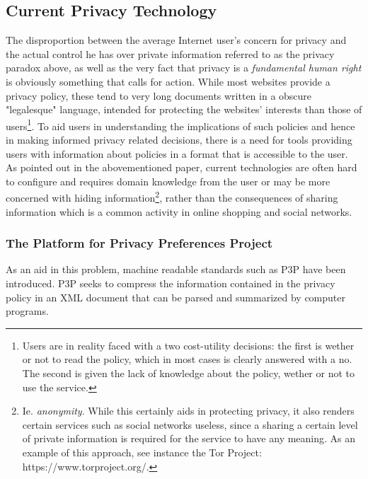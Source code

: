 \subsection{Current Privacy Technology}\label{privTech}
The disproportion between the average Internet user's concern for privacy and the actual control he has over private information referred to as the privacy paradox above, as well as the very fact that privacy is a \emph{fundamental human right} is obviously something that calls for action. While most websites provide a privacy policy, these tend to very long documents written in a obscure "legalesque" language, intended  for protecting the websites' interests than those of users\footnote{Users are in reality faced with a two cost-utility decisions: the first is wether or not to read the policy, which in most cases is clearly answered with a no. The second is given the lack of knowledge about the policy, wether or not to use the service.}. To aid users in understanding the implications of such policies and hence in making informed privacy related decisions, there is a need for tools providing users with information about policies in a format that is accessible to the user. As pointed out in the abovementioned paper, current technologies are often hard to configure and requires domain knowledge from the user or may be more concerned with hiding information\footnote{Ie. \emph{anonymity}. While this certainly aids in protecting privacy, it also renders certain services such as social networks useless, since a sharing a certain level of private information is required for the service to have any meaning. As an example of this approach, see instance the Tor Project: https://www.torproject.org/.}, rather than the consequences of sharing information which is a common activity in online shopping and social networks.

\subsubsection{The Platform for Privacy Preferences Project}
As an aid in this problem, machine readable standards such as P3P have been introduced. P3P seeks to compress the information contained in the privacy policy in an XML document that can be parsed and summarized by computer programs. 

